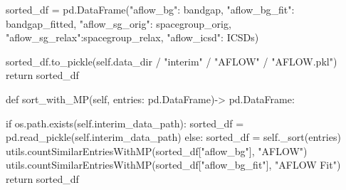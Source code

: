         sorted_df = pd.DataFrame({"aflow_bg":     bandgap,
                                 "aflow_bg_fit":  bandgap_fitted,
                                 "aflow_sg_orig": spacegroup_orig,
                                 "aflow_sg_relax":spacegroup_relax,
                                 "aflow_icsd":    ICSDs})

        sorted_df.to_pickle(self.data_dir / "interim" / "AFLOW" / "AFLOW.pkl")
        return sorted_df

    def sort_with_MP(self, entries: pd.DataFrame)-> pd.DataFrame:

        if os.path.exists(self.interim_data_path):
            sorted_df = pd.read_pickle(self.interim_data_path)
        else:
            sorted_df = self._sort(entries)
        utils.countSimilarEntriesWithMP(sorted_df["aflow_bg"], "AFLOW")
        utils.countSimilarEntriesWithMP(sorted_df["aflow_bg_fit"], "AFLOW Fit")
        return sorted_df
